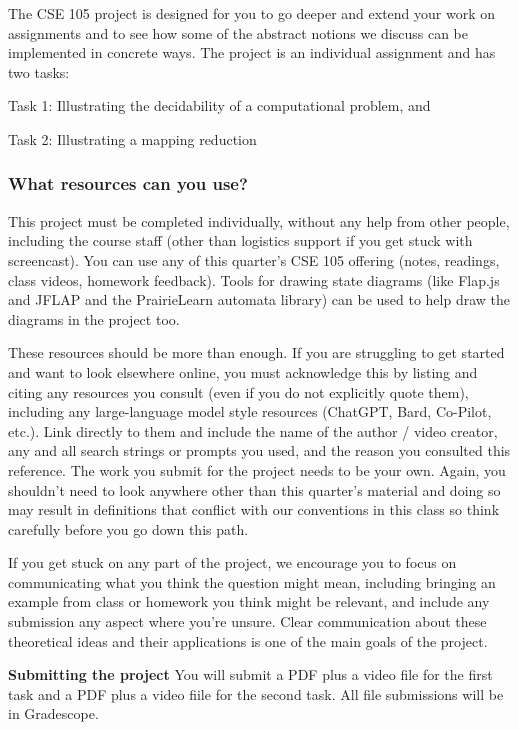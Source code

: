 \documentclass[12pt, oneside]{article}
\begin{document}
\thispagestyle{fancy}


The CSE 105 project is designed for you to go deeper and 
extend your work on assignments 
and to see how some of the abstract notions we discuss can 
be implemented in concrete ways. 
The project is an individual assignment and has two tasks: 

Task 1: Illustrating the decidability of a computational problem, and

Task 2: Illustrating a mapping reduction

\subsubsection*{What resources can you use?} This project must be completed individually, 
without any help from other people, including the course staff (other than logistics support if 
you get stuck with screencast).
You can use any of this quarter's CSE 105 offering (notes, readings, class videos, homework feedback). 
Tools for drawing state diagrams (like Flap.js and JFLAP and the PrairieLearn automata library) can be used to help draw the diagrams 
in the project too.

These resources should be more than enough.
If you are struggling to get started and want to look elsewhere online, 
you must acknowledge this by listing and citing any resources you consult 
(even if you do not explicitly quote them), including any large-language model style resources (ChatGPT, Bard, Co-Pilot, etc.). 
Link directly to them and include the name of the author / video creator, 
any and all search strings or prompts you used, and the reason you consulted this reference. The work you submit for the project needs to be your own. Again, you shouldn't need to look anywhere 
other than this quarter's material and doing so may result in definitions that
conflict with our conventions in this class so think carefully before you go down this path.

If you get stuck on any part of the project, we encourage you to focus on communicating what you think 
the question might mean, including bringing an example from class or homework you think might be relevant, and 
include any submission any aspect where you're unsure. Clear communication about these
theoretical ideas and their applications is one of the main goals of the project.

{\bf Submitting the project} You will submit a PDF plus a video file for the first task and a PDF plus a video fiile for the 
second task. All file submissions will be in Gradescope.
\end{document}
